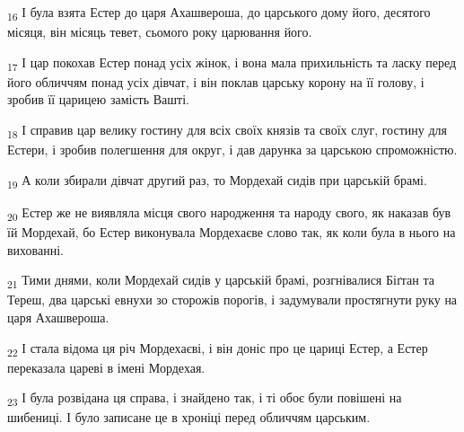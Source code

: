\begin{tcolorbox}
\textsubscript{16} І була взята Естер до царя Ахашвероша, до царського дому його, десятого місяця, він місяць тевет, сьомого року царювання його.
\end{tcolorbox}
\begin{tcolorbox}
\textsubscript{17} І цар покохав Естер понад усіх жінок, і вона мала прихильність та ласку перед його обличчям понад усіх дівчат, і він поклав царську корону на її голову, і зробив її царицею замість Вашті.
\end{tcolorbox}
\begin{tcolorbox}
\textsubscript{18} І справив цар велику гостину для всіх своїх князів та своїх слуг, гостину для Естери, і зробив полегшення для округ, і дав дарунка за царською спроможністю.
\end{tcolorbox}
\begin{tcolorbox}
\textsubscript{19} А коли збирали дівчат другий раз, то Мордехай сидів при царській брамі.
\end{tcolorbox}
\begin{tcolorbox}
\textsubscript{20} Естер же не виявляла місця свого народження та народу свого, як наказав був їй Мордехай, бо Естер виконувала Мордехаєве слово так, як коли була в нього на вихованні.
\end{tcolorbox}
\begin{tcolorbox}
\textsubscript{21} Тими днями, коли Мордехай сидів у царській брамі, розгнівалися Біґтан та Тереш, два царські евнухи зо сторожів порогів, і задумували простягнути руку на царя Ахашвероша.
\end{tcolorbox}
\begin{tcolorbox}
\textsubscript{22} І стала відома ця річ Мордехаєві, і він доніс про це цариці Естер, а Естер переказала цареві в імені Мордехая.
\end{tcolorbox}
\begin{tcolorbox}
\textsubscript{23} І була розвідана ця справа, і знайдено так, і ті обоє були повішені на шибениці. І було записане це в хроніці перед обличчям царським.
\end{tcolorbox}
